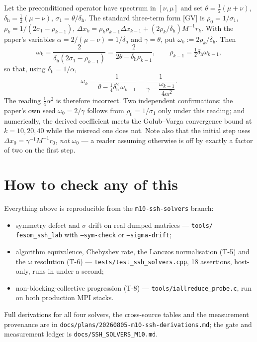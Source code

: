 \documentclass[11pt,a4paper]{article}
\newcommand{\Mi}{M^{-1}}
\newcommand{\src}[1]{\textsf{#1}}
\begin{document}
Let the preconditioned operator have spectrum in $[\nu,\mu]$ and set
$\theta=\tfrac12(\mu+\nu)$, $\delta_{\mathrm{h}}=\tfrac12(\mu-\nu)$,
$\sigma_1=\theta/\delta_{\mathrm{h}}$. The standard three-term form \src{[GV]} is
$\rho_0=1/\sigma_1$, $\rho_k=1/(2\sigma_1-\rho_{k-1})$,
$\Delta x_k=\rho_k\rho_{k-1}\Delta x_{k-1}+(2\rho_k/\delta_{\mathrm{h}})\Mi r_k$. With the
paper's variables $\alpha=2/(\mu-\nu)=1/\delta_{\mathrm{h}}$ and $\gamma=\theta$, put
$\omega_k:=2\rho_k/\delta_{\mathrm{h}}$. Then
\begin{equation}
  \omega_k=\frac{2}{\delta_{\mathrm{h}}(2\sigma_1-\rho_{k-1})}
         =\frac{2}{2\theta-\delta_{\mathrm{h}}\rho_{k-1}},
  \qquad \rho_{k-1}=\tfrac12\delta_{\mathrm{h}}\omega_{k-1},
\end{equation}
so that, using $\delta_{\mathrm{h}}=1/\alpha$,
\begin{equation}
  \omega_k=\frac{1}{\theta-\tfrac14\delta_{\mathrm{h}}^{2}\,\omega_{k-1}}
         =\frac{1}{\gamma-\dfrac{\omega_{k-1}}{4\alpha^{2}}}.
\end{equation}
The reading $\tfrac14\alpha^2$ is therefore incorrect. Two independent confirmations: the
paper's own seed $\omega_0=2/\gamma$ follows from $\rho_0=1/\sigma_1$ only under this reading;
and numerically, the derived coefficient meets the Golub--Varga convergence bound at
$k=10,20,40$ while the misread one does not. Note also that the initial step uses
$\Delta x_0=\gamma^{-1}\Mi r_0$, \emph{not} $\omega_0$ --- a reader assuming otherwise is off
by exactly a factor of two on the first step.

\section{How to check any of this}

Everything above is reproducible from the \texttt{m10-ssh-solvers} branch:
\begin{itemize}
  \item symmetry defect and $\sigma$ drift on real dumped matrices --- \texttt{tools/}\allowbreak
        \texttt{fesom\_ssh\_lab} with \texttt{--sym-check} or \texttt{--sigma-drift};
  \item algorithm equivalence, Chebyshev rate, the Lanczos normalisation (T-5) and the
        $\omega$ resolution (T-6) --- \texttt{tests/test\_ssh\_solvers.cpp}, 18 assertions,
        host-only, runs in under a second;
  \item non-blocking-collective progression (T-8) --- \texttt{tools/iallreduce\_probe.c},
        run on both production MPI stacks.
\end{itemize}
Full derivations for all four solvers, the cross-source tables and the measurement provenance
are in \texttt{docs/plans/20260805-m10-ssh-derivations.md}; the gate and measurement ledger is
\texttt{docs/SSH\_SOLVERS\_M10.md}.
\end{document}
